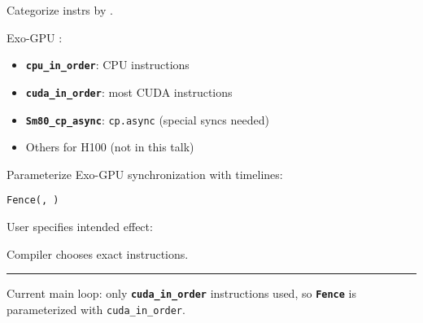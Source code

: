 \newpage
{}

{\LARGE
Categorize instrs by .

Exo-GPU :
\begin{itemize}
  \item \textbf{\texttt{cpu\_in\_order}}: CPU instructions
  \item \textbf{\texttt{cuda\_in\_order}}: most CUDA instructions
  \item \textbf{\texttt{Sm80\_cp\_async}}: \texttt{cp.async} (special syncs needed)
  \item Others for H100 (not in this talk)
\end{itemize}

}

\newpage
{}

{\LARGE
Parameterize Exo-GPU synchronization with timelines:

\begin{center}
  \texttt{Fence(, )}
\end{center}

User specifies intended effect:

\begin{center}
\end{center}

Compiler chooses exact instructions.


}

\newpage
{}

{\large

}

\vspace{3mm}
\hrule

{\LARGE
Current main loop:
only \textbf{\texttt{cuda\_in\_order}} instructions used,
so \textbf{\texttt{Fence}} is parameterized with \texttt{cuda\_in\_order}.
}

